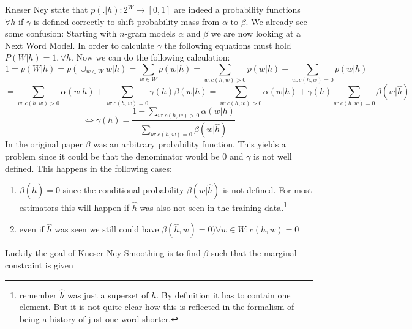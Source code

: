 \begin{appendix}
Kneser Ney state that $p(.|h):2^W\rightarrow [0,1]$ are indeed a probability functions $\forall h$ if $\gamma$ is defined correctly to shift probability mass from $\alpha$ to $\beta$. 
We already see some confusion: Starting with $n$-gram models $\alpha$ and $\beta$ we are now looking at a Next Word Model. 
In order to calculate $\gamma$ the following equations must hold $P(W|h)=1, \forall h$.
Now we can do the following calculation:
\[
1=p(W|h)=p(\cup_{w\in W}w|h)=\sum_{w\in W}p(w|h)=
\sum_{w:c(h,w)>0}p(w|h)+\sum_{w:c(h,w)=0}p(w|h)
\]
\[
=\sum_{w:c(h,w)>0}\alpha(w|h)+\sum_{w:c(h,w)=0}\gamma(h)\beta(w|h) = \sum_{w:c(h,w)>0}\alpha(w|h)+\gamma(h)\sum_{w:c(h,w)=0}\beta(w|\hat h)
\] 
\[
\iff \gamma(h)=\frac{1-\sum_{w:c(h,w)>0}\alpha(w|h)}{\sum_{w:c(h,w)=0}\beta(w|\hat h)}
\]
In the original paper $\beta$ was an arbitrary probability function. 
This yields a problem since it could be that the denominator would be $0$ and $\gamma$ is not well defined. 
This happens in the following cases:
\begin{enumerate}
\item $\beta(\hat h)=0$ since the conditional probability $\beta(w|\hat h)$ is not defined. For most estimators this will happen if $\hat h$ was also not seen in the training data.\footnote{remember $\hat h$ was just a superset of $h$. By definition it has to contain one element. But it is not quite clear how this is reflected in the formalism of being a history of just one word shorter.}
\item even if $\hat h$ was seen we still could have $\beta(\hat h,w)=0)\forall w\in W : c(h,w)=0$
\end{enumerate}
Luckily the goal of Kneser Ney Smoothing is to find $\beta$ such that the marginal constraint is given  


\end{appendix}
